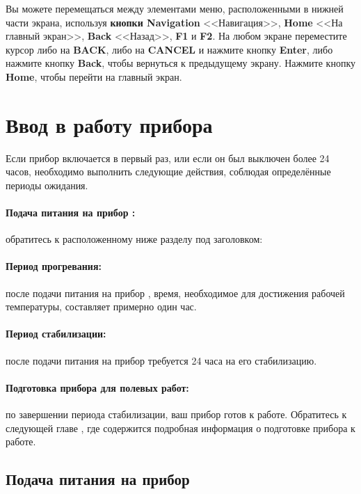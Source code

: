 Вы можете перемещаться между элементами меню, расположенными в нижней части
экрана, используя \textbf{кнопки Navigation} <<Навигация>>, \textbf{Home} <<На
главный экран>>, \textbf{Back} <<Назад>>, \textbf{F1} и \textbf{F2}. На любом
экране переместите курсор либо на \textbf{BACK}, либо на \textbf{CANCEL} и
нажмите кнопку \textbf{Enter}, либо нажмите кнопку \textbf{Back}, чтобы
вернуться к предыдущему экрану. Нажмите кнопку \textbf{Home}, чтобы перейти на
главный экран.

\section[Ввод в работу]{Ввод в работу прибора \cg{}}

Если прибор \cg{} включается в первый раз, или если он
был выключен более 24 часов, необходимо выполнить следующие действия, соблюдая
определённые периоды ожидания.

\paragraph[Подача питания]{Подача питания на прибор \cg{}:} обратитесь к расположенному ниже
разделу под заголовком: 

\paragraph{Период прогревания:} после подачи питания на прибор \cg{}{}, время,
необходимое для достижения рабочей температуры, составляет примерно один час.

\paragraph{Период стабилизации:} после подачи питания на прибор требуется 24
часа на его стабилизацию.

\paragraph{Подготовка прибора для полевых работ:} по завершении периода
стабилизации, ваш прибор \cg{} готов к работе.  Обратитесь к следующей главе
, где содержится подробная информация
о подготовке прибора к работе.

\subsection[Подача питания]{Подача питания на прибор \cg{}}
\label{subsec:powering_up_the_cg6_autograv}

